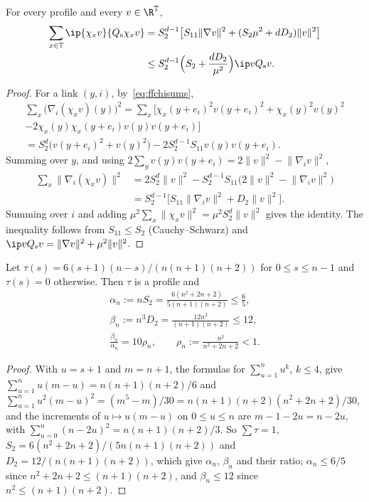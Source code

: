 \begin{lemma}\label{lem:ffpartition}
For every profile and every $v\in\R^{\mathbb T}$,
\begin{align*}
\sum_{x\in\mathbb T}\ip{\chi_xv}{Q_{\rm s}\chi_xv}&=S_2^{d-1}\bigl[S_{11}
\lVert\nabla v\rVert^2+(S_2\mu^2+dD_2)\lVert v\rVert^2\bigr]\\
&\le S_2^{d-1}\Bigl(S_2+\frac{dD_2}{\mu^2}\Bigr)\ip v{Q_{\rm s}v}.
\end{align*}
\end{lemma}

\begin{proof}
For a link $(y,i)$, by~\eqref{eq:ffchisums},
\begin{multline*}
\sum_x\bigl(\nabla_i(\chi_xv)(y)\bigr)^2=\sum_x\bigl[\chi_x(y+e_i)^2v(y+e_i)^2
+\chi_x(y)^2v(y)^2\\
-2\chi_x(y)\chi_x(y+e_i)v(y)v(y+e_i)\bigr]\\
=S_2^d\bigl(v(y+e_i)^2+v(y)^2\bigr)-2S_2^{d-1}S_{11}v(y)v(y+e_i).
\end{multline*}
Summing over $y$, and using $2\sum_yv(y)v(y+e_i)=2\lVert v\rVert^2-\lVert
\nabla_iv\rVert^2$,
\begin{align*}
\sum_x\lVert\nabla_i(\chi_xv)\rVert^2&=2S_2^d\lVert v\rVert^2-S_2^{d-1}S_{11}
\bigl(2\lVert v\rVert^2-\lVert\nabla_iv\rVert^2\bigr)\\
&=S_2^{d-1}\bigl[S_{11}\lVert\nabla_iv\rVert^2+D_2\lVert v\rVert^2\bigr].
\end{align*}
Summing over $i$ and adding $\mu^2\sum_x\lVert\chi_xv\rVert^2=\mu^2S_2^d
\lVert v\rVert^2$ gives the identity. The inequality follows from $S_{11}\le
S_2$ (Cauchy--Schwarz) and $\ip v{Q_{\rm s}v}=\lVert\nabla v\rVert^2+\mu^2
\lVert v\rVert^2$.
\end{proof}

\begin{lemma}\label{lem:ffparabola}
Let $\tau(s)=6(s+1)(n-s)/(n(n+1)(n+2))$ for $0\le s\le n-1$ and $\tau(s)=0$
otherwise. Then $\tau$ is a profile and
\begin{gather*}
\alpha_n:=nS_2=\frac{6(n^2+2n+2)}{5(n+1)(n+2)}\le\frac65,\\
\beta_n:=n^3D_2=\frac{12n^2}{(n+1)(n+2)}\le12,\\
\frac{\beta_n}{\alpha_n}=10\rho_n,\qquad\rho_n:=\frac{n^2}{n^2+2n+2}<1 .
\end{gather*}
\end{lemma}

\begin{proof}
With $u=s+1$ and $m=n+1$, the formulas for $\sum_{u=1}^nu^k$, $k\le4$, give
$\sum_{u=1}^nu(m-u)=n(n+1)(n+2)/6$ and $\sum_{u=1}^nu^2(m-u)^2=(m^5-m)/30=
n(n+1)(n+2)(n^2+2n+2)/30$, and the increments of $u\mapsto u(m-u)$ on $0\le
u\le n$ are $m-1-2u=n-2u$, with $\sum_{u=0}^n(n-2u)^2=n(n+1)(n+2)/3$. So
$\sum\tau=1$, $S_2=6(n^2+2n+2)/(5n(n+1)(n+2))$ and $D_2=12/(n(n+1)(n+2))$,
which give $\alpha_n$, $\beta_n$ and their ratio; $\alpha_n\le6/5$ since
$n^2+2n+2\le(n+1)(n+2)$, and $\beta_n\le12$ since $n^2\le(n+1)(n+2)$.
\end{proof}

